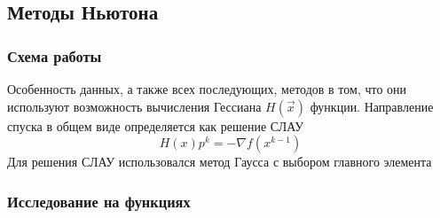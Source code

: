 \documentclass[english]{article}
\begin{document}
\subsection{Методы Ньютона}
\subsubsection{Схема работы}
Особенность данных, а также всех последующих, методов в том, что они
используют возможность вычисления Гессиана \(H(\vec{x})\)
функции. Направление спуска в общем виде определяется как решение СЛАУ
\[ H(x)p^k = -\nabla f(x^{k - 1}) \]
Для решения СЛАУ использовался метод Гаусса с выбором главного элемента
\subsubsection{Исследование на функциях}
\end{document}
